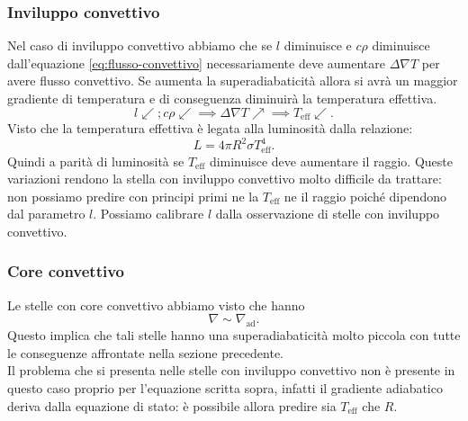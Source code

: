 \subsubsection{Inviluppo convettivo}
\label{subsubsec:Inviluppo convettivo}
Nel caso di inviluppo convettivo abbiamo che se $l$ diminuisce e $c\rho$ diminuisce dall'equazione \ref{eq:flusso-convettivo} necessariamente deve aumentare $\Delta\nabla T$ per avere flusso convettivo. Se aumenta la superadiabaticità allora si avrà un maggior gradiente di temperatura e di conseguenza diminuirà la temperatura effettiva.
\[
	l\swarrow ; c\rho\swarrow \implies \Delta\nabla T \nearrow \implies T_\text{eff} \swarrow
.\] 
Visto che la temperatura effettiva è legata alla luminosità dalla relazione:
\[
	L= 4 \pi  R^2 \sigma  T_\text{eff}^4
.\] 
Quindi a parità di luminosità se $T_\text{eff} $ diminuisce deve aumentare il raggio. Queste variazioni rendono la stella con inviluppo convettivo molto difficile  da trattare: non possiamo predire con principi primi ne la $T_\text{eff} $ ne il raggio poiché dipendono dal parametro $l$. Possiamo calibrare $l$ dalla osservazione di stelle con inviluppo convettivo.
\subsubsection{Core convettivo}
\label{subsubsec:Core convettivo}
Le stelle con core convettivo abbiamo visto che hanno 
\[
	\nabla \sim \nabla_\text{ad} 
.\] 
Questo implica che tali stelle hanno una superadiabaticità molto piccola con tutte le conseguenze affrontate nella sezione precedente.\\
Il problema che si presenta nelle stelle con inviluppo convettivo non è presente in questo caso proprio per l'equazione scritta sopra, infatti il gradiente adiabatico deriva dalla equazione di stato: è possibile allora predire sia $T_\text{eff}$ che $R$.
